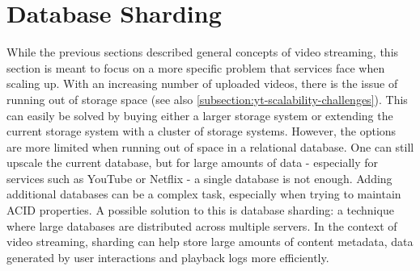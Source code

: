 \begin{table}[h]
    \centering
    \caption{Comparison of In-House Storage, Cloud Storage and \ac{P2P} for Video Streaming}
    \label{tab:comparison_storage_delivery}
\end{table}

\section{Database Sharding}\label{section:db-sharding}
While the previous sections described general concepts of video streaming, this section is meant to focus on a more specific problem that services face when scaling up. 
With an increasing number of uploaded videos, there is the issue of running out of storage space (see also \autoref{subsection:yt-scalability-challenges}). This can easily be solved by buying either a larger storage system or extending the current storage system with a cluster of storage systems. However, the options are more limited when running out of space in a relational database. One can still upscale the current database, but for large amounts of data - especially for services such as YouTube or Netflix - a single database is not enough. Adding additional databases can be a complex task, especially when trying to maintain \ac{ACID} properties. 
A possible solution to this is database sharding: a technique where large databases are distributed across multiple servers. In the context of video streaming, sharding can help store large amounts of content metadata, data generated by user interactions and playback logs more efficiently.

